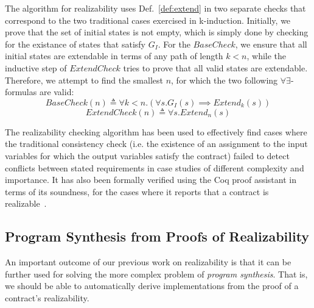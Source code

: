 The algorithm for realizability uses Def.~\ref{def:extend} in two
separate checks that correspond to the two traditional cases exercised
in k-induction. Initially, we prove that the set of initial states is not
empty, which is simply done by checking for the existance of states that
satisfy $G_I$. For the $\mathit{BaseCheck}$, we ensure that all initial states
are extendable in terms of any path of length $k < n$, while the inductive step of $\mathit{ExtendCheck}$ tries to prove that all valid states are extendable. Therefore, we attempt to find the
smallest $n$, for which the two following $\forall\exists$-formulas
are valid:%
%
\begin{equation}
\label{eq:sbcheck}
\mathit{BaseCheck}(n) \triangleq \forall k < n. (\forall s. G_I(s)
	  	\implies \mathit{Extend}_k(s))
\end{equation}%
%
\begin{equation}
\label{eq:echeck}
\mathit{ExtendCheck}(n) \triangleq \forall s. \mathit{Extend}_n(s)
\end{equation}

The realizability checking algorithm has been used to effectively find cases
where the traditional consistency check (i.e. the existence of an assignment
to the input variables for which the output variables satisfy the contract)
failed to detect conflicts between stated requirements in case studies of
different complexity and importance. It has also been formally verified using the Coq proof assistant in terms of its
soundness, for the cases where it reports that a contract is
realizable~\cite{katis2015machine}.

\subsection{Program Synthesis from Proofs of Realizability}

An important outcome of our previous work on realizability is that it
can be further used for solving the more complex problem of
\emph{program synthesis}. That is, we should be able to automatically
derive implementations from the proof of a contract's realizability.


